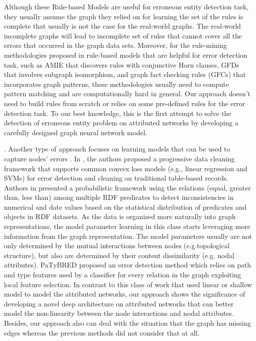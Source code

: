 Although these Rule-based Models are useful for erroneous entity detection task, they usually assume the graph they relied on for learning the set of the rules is complete that usually is not the case for the real-world graphs. The real-world incomplete graphs will lead to incomplete set of rules that cannot cover all the errors that occurred in the graph data sets. Moreover, for the rule-mining methodologies proposed in rule-based models that are helpful for error detection task, such as AMIE \cite{galarraga2013amie,galarraga2015fast} that discovers rules with conjunctive Horn clauses, GFDs \cite{lin2019discovering} that involves subgraph isomorphism, and
graph fact checking rules (GFCs) that incorporates graph patterns, these methodologies usually need to compute pattern matching and are computationally hard in general. Our approach doesn't need to build rules from scratch or relies on some pre-defined rules for the error detection task. To our best knowledge, this is the first attempt to solve the detection of erroneous entity problem on attributed networks by developing a carefully designed graph neural network
model.

.
Another type of approach focuses on learning models that can be used to capture nodes' errors \cite{rashid2019completeness}. 
In \cite{krishnan2016activeclean}, the authors proposed a progressive data cleaning framework that supports common convex loss models (e.g., linear regression and SVMs) for error detection and cleaning on traditional table-based records. Authors in \cite{wienand2014detecting} presented a probabilistic framework using the relations (equal, greater than, less than) among multiple
RDF predicates to detect inconsistencies in numerical and date
values based on the statistical distribution of predicates and objects in RDF datasets.
As the data is organized more naturally into graph representations, the model parameter learning in this class starts leveraging more information from the graph representation. The model parameters usually are not only determined by the 
mutual interactions between nodes (e.g.topological structure), but also are determined by their content dissimilarity
(e.g. nodal attributes).  PaTyBRED \cite{melo2017detection} proposed an error detection method which relies on path and type features used by a classifier for
every relation in the graph exploiting local feature selection.  In contrast to this class of work that used linear or shallow model to model the attributed networks, our approach shows the significance of developing a novel deep architecture on attributed networks that can better model the non-linearity between the node interactions and nodal attributes. Besides, our approach also can deal with the situation that the graph has missing edges whereas the previous methods did not consider that at all. 

